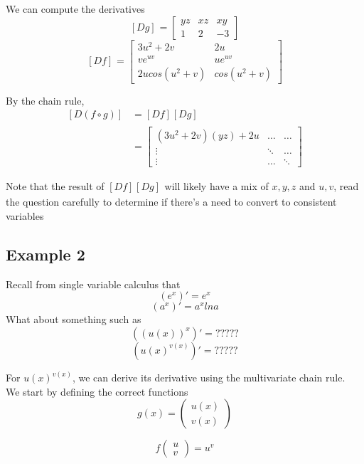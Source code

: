 We can compute the derivatives \[
  \left[ D g \right]_{} = \begin{bmatrix} 
     yz & xz & xy \\
     1 & 2 & -3
  \end{bmatrix}
\] 
\[
\left[ D f \right]_{}  = \begin{bmatrix} 
   3u^2 + 2v & 2u \\
   ve^{uv} & ue^{uv} \\
   2u cos(u^2 + v) & cos(u^2 + v)
\end{bmatrix}
\] 

By the chain rule, 
\begin{align*}
   \left[ D ( f \circ g) \right]_{}  &= \left[ D f \right]_{} \left[ D g \right]_{}  \\
                                     &= \begin{bmatrix} 
                                        (3u^2 + 2v)(yz) + 2u & \hdots & \hdots \\
                                                             \vdots & \ddots & \hdots \\
                                                             \vdots & \hdots & \ddots
                                     \end{bmatrix}
\end{align*}

Note that the result of $ \left[ D f \right]_{} \left[ D g \right]_{} $ will likely have a mix of $x, y,z$ and $u, v$, read the question carefully to determine if there's a need to convert to consistent variables

\subsection{Example 2}
Recall from single variable calculus that 
\[
   (e^x)' = e^x
\] 
\[
   (a^x)' = a^x ln a
\] 
What about something such as 
\[
   ((u(x))^x)' =   ?????
\] 
\[
   (u(x)^{v(x)})' = ?????
\] 

For $ u(x)^{v(x)}$, we can derive its derivative using the multivariate chain rule. \\

We start by defining the correct functions 
\[
  g(x) = \begin{pmatrix} u(x) \\ v(x) \end{pmatrix} 
\] 

\[
  f \begin{pmatrix} u \\ v \end{pmatrix}  = u^v
\] 

